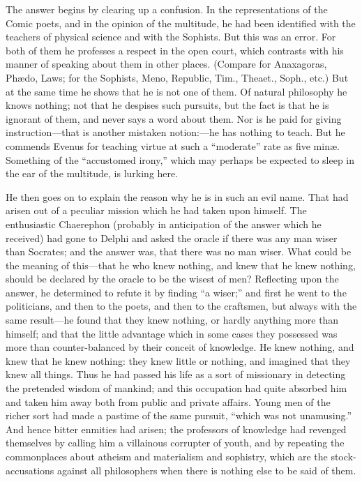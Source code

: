 \documentclass[11pt,letter]{article}
\begin{document}
\par  The answer begins by clearing up a confusion. In the representations of the Comic poets, and in the opinion of the multitude, he had been identified with the teachers of physical science and with the Sophists. But this was an error. For both of them he professes a respect in the open court, which contrasts with his manner of speaking about them in other places. (Compare for Anaxagoras, Phædo, Laws; for the Sophists, Meno, Republic, Tim., Theaet., Soph., etc.) But at the same time he shows that he is not one of them. Of natural philosophy he knows nothing; not that he despises such pursuits, but the fact is that he is ignorant of them, and never says a word about them. Nor is he paid for giving instruction—that is another mistaken notion:—he has nothing to teach. But he commends Evenus for teaching virtue at such a “moderate” rate as five minæ. Something of the “accustomed irony,” which may perhaps be expected to sleep in the ear of the multitude, is lurking here.

\par  He then goes on to explain the reason why he is in such an evil name. That had arisen out of a peculiar mission which he had taken upon himself. The enthusiastic Chaerephon (probably in anticipation of the answer which he received) had gone to Delphi and asked the oracle if there was any man wiser than Socrates; and the answer was, that there was no man wiser. What could be the meaning of this—that he who knew nothing, and knew that he knew nothing, should be declared by the oracle to be the wisest of men? Reflecting upon the answer, he determined to refute it by finding “a wiser;” and first he went to the politicians, and then to the poets, and then to the craftsmen, but always with the same result—he found that they knew nothing, or hardly anything more than himself; and that the little advantage which in some cases they possessed was more than counter-balanced by their conceit of knowledge. He knew nothing, and knew that he knew nothing: they knew little or nothing, and imagined that they knew all things. Thus he had passed his life as a sort of missionary in detecting the pretended wisdom of mankind; and this occupation had quite absorbed him and taken him away both from public and private affairs. Young men of the richer sort had made a pastime of the same pursuit, “which was not unamusing.” And hence bitter enmities had arisen; the professors of knowledge had revenged themselves by calling him a villainous corrupter of youth, and by repeating the commonplaces about atheism and materialism and sophistry, which are the stock-accusations against all philosophers when there is nothing else to be said of them.
\end{document}
